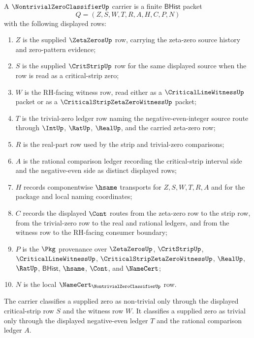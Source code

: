 \begin{definition}
\label{def:nontrivial-zero-classifier-carrier}
A $\NontrivialZeroClassifierUp$ carrier is a finite $\mathsf{BHist}$ packet
$$
Q=(Z,S,W,T,R,A,H,C,P,N)
$$
with the following displayed rows:
\begin{enumerate}
\item $Z$ is the supplied $\ZetaZerosUp$ row, carrying the zeta-zero source history and zero-pattern evidence;
\item $S$ is the supplied $\CritStripUp$ row for the same displayed source when the row is read as a critical-strip zero;
\item $W$ is the RH-facing witness row, read either as a $\CriticalLineWitnessUp$ packet or as a $\CriticalStripZetaZeroWitnessUp$ packet;
\item $T$ is the trivial-zero ledger row naming the negative-even-integer source route through $\IntUp$, $\RatUp$, $\RealUp$, and the carried zeta-zero row;
\item $R$ is the real-part row used by the strip and trivial-zero comparisons;
\item $A$ is the rational comparison ledger recording the critical-strip interval side and the negative-even side as distinct displayed rows;
\item $H$ records componentwise $\hsame$ transports for $Z,S,W,T,R,A$ and for the package and local naming coordinates;
\item $C$ records the displayed $\Cont$ routes from the zeta-zero row to the strip row, from the trivial-zero row to the real and rational ledgers, and from the witness row to the RH-facing consumer boundary;
\item $P$ is the $\Pkg$ provenance over $\ZetaZerosUp$, $\CritStripUp$, $\CriticalLineWitnessUp$, $\CriticalStripZetaZeroWitnessUp$, $\RealUp$, $\RatUp$, $\mathsf{BHist}$, $\hsame$, $\Cont$, and $\NameCert$;
\item $N$ is the local $\NameCert_{\NontrivialZeroClassifierUp}$ row.
\end{enumerate}
The carrier classifies a supplied zero as non-trivial only through the displayed critical-strip row $S$ and the witness row $W$. It classifies a supplied zero as trivial only through the displayed negative-even ledger $T$ and the rational comparison ledger $A$.
\end{definition}

